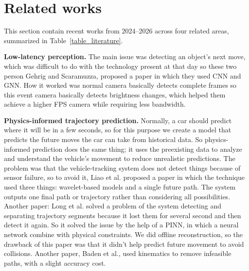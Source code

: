 \documentclass[preprint,12pt]{elsarticle}
\begin{document}
\section{Related works} \label{section2}
This section contain recent works from 2024--2026 across four related areas, summarized in Table~\ref{table_literature}.

\textbf{Low-latency perception.} The main issue was detecting an object's next move, which was difficult to do with the technology present at that day so these two person Gehrig and Scaramuzza\cite{gehrig2024low}, proposed a paper in which they used CNN and GNN. How it worked was normal camera basically detects complete frames so this event camera basically detects brightness changes, which helped them achieve a higher FPS camera while requiring less bandwidth. 

\textbf{Physics-informed trajectory prediction.} Normally, a car should predict where it will be in a few seconds, so for this purpose we create a model that predicts the future moves the car can take from historical data.  So physics-informed prediction does the same thing; it uses the preexisting data to analyze and understand the vehicle's movement to reduce unrealistic predictions. The problem was that the vehicle-tracking system does not detect things because of sensor failure, so to avoid it, Liao et al. \cite{liao2024physics} proposed a paper in which the technique used three things: wavelet-based models and a single future path. The system outputs one final path or trajectory rather than considering all possibilities. Another paper: Long et al. \cite{long2024pinn} solved a problem of the system detecting and separating trajectory segments because it lost them for several second and then detect it again. So it solved the issue by the help of a PINN, in which a neural network combine with physical constraints. We did offline reconstruction, so the drawback of this paper was that it didn't help predict future movement to avoid collisions. Another paper, Baden et al., \cite{baden2025tpk} used kinematics to remove infeasible paths, with a slight accuracy cost.
\end{document}
